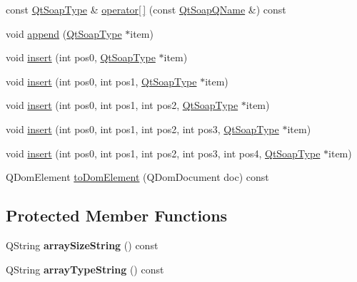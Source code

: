 \begin{DoxyCompactItemize}
\item 
const \mbox{\hyperlink{class_qt_soap_type}{Qt\+Soap\+Type}} \& \mbox{\hyperlink{class_qt_soap_array_a0efe4fd3ef51bbd341500e65e8e0ac79}{operator\mbox{[}$\,$\mbox{]}}} (const \mbox{\hyperlink{class_qt_soap_q_name}{Qt\+Soap\+Q\+Name}} \&) const
\item 
void \mbox{\hyperlink{class_qt_soap_array_a52d39a5ffe682ccb5c9196654136fe96}{append}} (\mbox{\hyperlink{class_qt_soap_type}{Qt\+Soap\+Type}} $\ast$item)
\item 
void \mbox{\hyperlink{class_qt_soap_array_a7be8113dc4c686e1ea243b988269f50d}{insert}} (int pos0, \mbox{\hyperlink{class_qt_soap_type}{Qt\+Soap\+Type}} $\ast$item)
\item 
void \mbox{\hyperlink{class_qt_soap_array_ae53bbc75f10af211b8c02e0e62a3260a}{insert}} (int pos0, int pos1, \mbox{\hyperlink{class_qt_soap_type}{Qt\+Soap\+Type}} $\ast$item)
\item 
void \mbox{\hyperlink{class_qt_soap_array_a44e2b7ea13cf3f94f48a6751ff3d448b}{insert}} (int pos0, int pos1, int pos2, \mbox{\hyperlink{class_qt_soap_type}{Qt\+Soap\+Type}} $\ast$item)
\item 
void \mbox{\hyperlink{class_qt_soap_array_a5c02c84ee4a0b8e4836df3607aecb5a4}{insert}} (int pos0, int pos1, int pos2, int pos3, \mbox{\hyperlink{class_qt_soap_type}{Qt\+Soap\+Type}} $\ast$item)
\item 
void \mbox{\hyperlink{class_qt_soap_array_a27759cc7f9f2d192bba0f5a0283dd9ef}{insert}} (int pos0, int pos1, int pos2, int pos3, int pos4, \mbox{\hyperlink{class_qt_soap_type}{Qt\+Soap\+Type}} $\ast$item)
\item 
Q\+Dom\+Element \mbox{\hyperlink{class_qt_soap_array_afd48e465aad1088003c1cc7024b99e81}{to\+Dom\+Element}} (Q\+Dom\+Document doc) const
\end{DoxyCompactItemize}
\subsection*{Protected Member Functions}
\begin{DoxyCompactItemize}
\item 
\mbox{\label{class_qt_soap_array_a96f77f48f249d76d22d9c17c4c236358}} 
Q\+String {\bfseries array\+Size\+String} () const
\item 
\mbox{\label{class_qt_soap_array_a31f3526f175f69c9932f37e61eaa839c}} 
Q\+String {\bfseries array\+Type\+String} () const
\end{DoxyCompactItemize}
